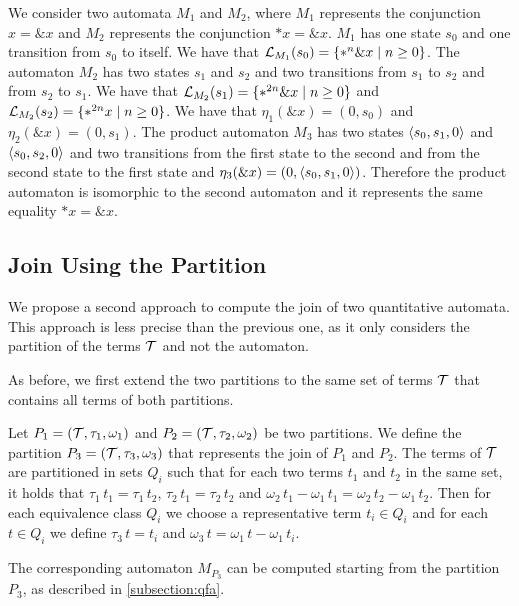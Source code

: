 \begin{example}\label{example:join-subset}
    We consider two automata $M_1$ and $M_2$, where $M_1$ represents the conjunction $x = \&x$ and $M_2$ represents the conjunction $*x = \&x$.
    $M_1$ has one state $s_0$ and one transition from $s_0$ to itself. We have that $\mathcal{L}_{M_1}(s_0) =\{*^n\&x\mid n \geq 0\}$.
    The automaton $M_2$ has two states $s_1$ and $s_2$ and two transitions from $s_1$ to $s_2$ and from $s_2$ to $s_1$. We have that $\mathcal{L}_{M_2}(s_1) = \{*^{2n}\&x\mid n \geq 0\}$ and $\mathcal{L}_{M_2}(s_2) = \{*^{2n}x\mid n \geq 0\}$.
    We have that $\eta_1(\&x) = (0, s_0)$ and $\eta_2 (\&x) = (0, s_1)$.
    The product automaton $M_3$ has two states $\langle s_0, s_1, 0\rangle$ and $\langle s_0, s_2, 0\rangle$ and two transitions from the first state to the second and from the second state to the first state and $\eta_3(\&x) = (0, \langle s_0, s_1, 0\rangle)$.
    Therefore the product automaton is isomorphic to the second automaton and it represents the same equality $*x = \&x$.
\end{example}

\subsection{Join Using the Partition}\label{subsection:join-partition}

We propose a second approach to compute the join of two quantitative automata.
This approach is less precise than the previous one, as it only considers the partition of the terms $\mathcal{T}$ and not the automaton.

As before, we first extend the two partitions to the same set of terms $\mathcal{T}$ that contains all terms of both partitions.

Let $P_1 = (\mathcal{T}, \tau_1, \omega_1)$ and $P_2 = (\mathcal{T}, \tau_2, \omega_2)$ be two partitions.
We define the partition $P_3 = (\mathcal{T}, \tau_3, \omega_3)$ that represents the join of $P_1$ and $P_2$.
The terms of $\mathcal{T}$ are partitioned in sets $Q_i$ such that for each two terms $t_1$ and $t_2$ in the same set, it holds that $\tau_1\,t_1 = \tau_1\,t_2$, $\tau_2\,t_1 = \tau_2\,t_2$ and $\omega_2\,t_1 -\omega_1\,t_1 = \omega_2\,t_2 - \omega_1\,t_2$.
Then for each equivalence class $Q_i$ we choose a representative term $t_i\in Q_i$ and
for each $t \in Q_i$ we define $\tau_3\,t = t_i$ and $\omega_3\,t = \omega_1\,t - \omega_1\,t_i$.

The corresponding automaton $M_{P_3}$ can be computed starting from the partition $P_3$,
as described in \cref{subsection:qfa}.

